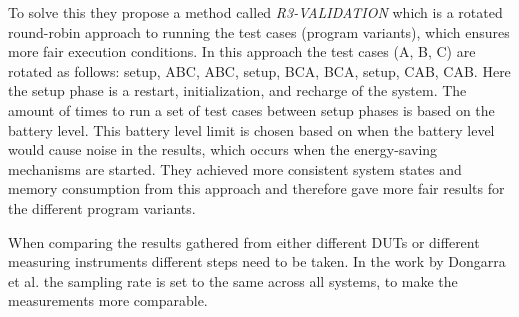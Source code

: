 To solve this they propose a method called \textit{R3-VALIDATION}\cite{Bokhari2020r3} which is a rotated round-robin approach to running the test cases (program variants), which ensures more fair execution conditions. In this approach the test cases (A, B, C) are rotated as follows: setup, ABC, ABC, setup, BCA, BCA, setup, CAB, CAB. Here the setup phase is a restart, initialization, and recharge of the system. The amount of times to run a set of test cases between setup phases is based on the battery level. This battery level limit is chosen based on when the battery level would cause noise in the results, which occurs when the energy-saving mechanisms are started. They achieved more consistent system states and memory consumption from this approach and therefore gave more fair results for the different program variants.\cite{Bokhari2020r3}\nytafsnit

When comparing the results gathered from either different DUTs or different measuring instruments different steps need to be taken. In the work by Dongarra et al.\cite[]{Dongarra2012} the sampling rate is set to the same across all systems, to make the measurements more comparable.